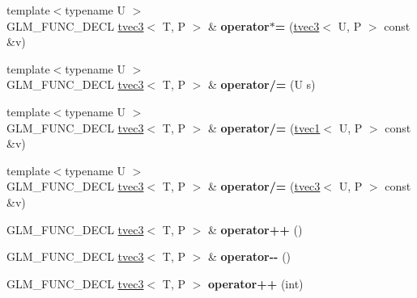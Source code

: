 \begin{DoxyCompactItemize}
\item 
\hypertarget{structglm_1_1tvec3_a924cfee1337bc2f0800519e5fbdf902f}{{\footnotesize template$<$typename U $>$ }\\G\-L\-M\-\_\-\-F\-U\-N\-C\-\_\-\-D\-E\-C\-L \hyperlink{structglm_1_1tvec3}{tvec3}$<$ T, P $>$ \& {\bfseries operator$\ast$=} (\hyperlink{structglm_1_1tvec3}{tvec3}$<$ U, P $>$ const \&v)}\label{structglm_1_1tvec3_a924cfee1337bc2f0800519e5fbdf902f}

\item 
\hypertarget{structglm_1_1tvec3_a89051232b40884c6723a3479d4e08a7e}{{\footnotesize template$<$typename U $>$ }\\G\-L\-M\-\_\-\-F\-U\-N\-C\-\_\-\-D\-E\-C\-L \hyperlink{structglm_1_1tvec3}{tvec3}$<$ T, P $>$ \& {\bfseries operator/=} (U s)}\label{structglm_1_1tvec3_a89051232b40884c6723a3479d4e08a7e}

\item 
\hypertarget{structglm_1_1tvec3_a05b1642c5a3b3be5a2bac556a06f3118}{{\footnotesize template$<$typename U $>$ }\\G\-L\-M\-\_\-\-F\-U\-N\-C\-\_\-\-D\-E\-C\-L \hyperlink{structglm_1_1tvec3}{tvec3}$<$ T, P $>$ \& {\bfseries operator/=} (\hyperlink{structglm_1_1tvec1}{tvec1}$<$ U, P $>$ const \&v)}\label{structglm_1_1tvec3_a05b1642c5a3b3be5a2bac556a06f3118}

\item 
\hypertarget{structglm_1_1tvec3_a0e3c90e6a8dbab2102b88775942261d1}{{\footnotesize template$<$typename U $>$ }\\G\-L\-M\-\_\-\-F\-U\-N\-C\-\_\-\-D\-E\-C\-L \hyperlink{structglm_1_1tvec3}{tvec3}$<$ T, P $>$ \& {\bfseries operator/=} (\hyperlink{structglm_1_1tvec3}{tvec3}$<$ U, P $>$ const \&v)}\label{structglm_1_1tvec3_a0e3c90e6a8dbab2102b88775942261d1}

\item 
\hypertarget{structglm_1_1tvec3_ac7d121d0cd2f4f53227be86b4c08289f}{G\-L\-M\-\_\-\-F\-U\-N\-C\-\_\-\-D\-E\-C\-L \hyperlink{structglm_1_1tvec3}{tvec3}$<$ T, P $>$ \& {\bfseries operator++} ()}\label{structglm_1_1tvec3_ac7d121d0cd2f4f53227be86b4c08289f}

\item 
\hypertarget{structglm_1_1tvec3_a61447785338db749ad3bdb5c97b8c710}{G\-L\-M\-\_\-\-F\-U\-N\-C\-\_\-\-D\-E\-C\-L \hyperlink{structglm_1_1tvec3}{tvec3}$<$ T, P $>$ \& {\bfseries operator-\/-\/} ()}\label{structglm_1_1tvec3_a61447785338db749ad3bdb5c97b8c710}

\item 
\hypertarget{structglm_1_1tvec3_ab316ac7b6ea57d038e304dc43b9f3490}{G\-L\-M\-\_\-\-F\-U\-N\-C\-\_\-\-D\-E\-C\-L \hyperlink{structglm_1_1tvec3}{tvec3}$<$ T, P $>$ {\bfseries operator++} (int)}\label{structglm_1_1tvec3_ab316ac7b6ea57d038e304dc43b9f3490}


\end{DoxyCompactItemize}
